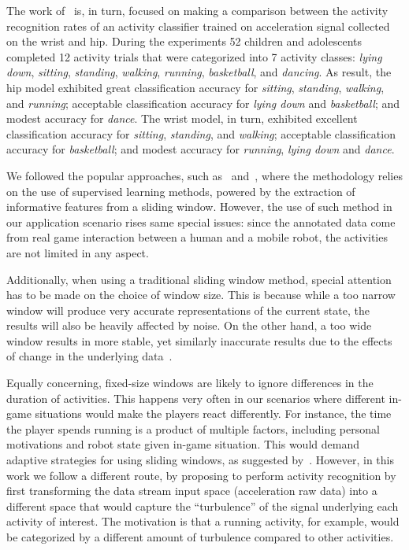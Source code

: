 The work of~\cite{trost_machine_2014} is, in turn, focused on making a comparison between the activity recognition rates of an activity classifier trained on acceleration signal collected on the wrist and hip. During the experiments 52 children and adolescents completed 12 activity trials that were categorized into 7 activity classes: \textit{lying down}, \textit{sitting}, \textit{standing}, \textit{walking}, \textit{running}, \textit{basketball}, and \textit{dancing}. As result, the hip model exhibited great classification accuracy for \textit{sitting}, \textit{standing}, \textit{walking}, and \textit{running}; acceptable classification accuracy for \textit{lying down} and \textit{basketball}; and modest accuracy for \textit{dance}. The wrist model, in turn, exhibited excellent classification accuracy for \textit{sitting}, \textit{standing}, and \textit{walking}; acceptable classification accuracy for \textit{basketball}; and modest accuracy for \textit{running}, \textit{lying down} and \textit{dance}.

We followed the popular approaches, such as~\cite{ravi_activity_2005} and~\cite{bao_activity_2004}, where the methodology relies on the use of supervised learning methods, powered by the extraction of informative features from a sliding window. However, the use of such method in our application scenario rises same special issues: since the annotated data come from real game interaction between a human and a mobile robot, the activities are not limited in any aspect.

Additionally, when using a traditional sliding window method, special attention has to be made on the choice of window size. This is because while a too narrow window will produce very accurate representations of the current state, the results will also be heavily affected by noise. On the other hand, a too wide window results in more stable, yet similarly inaccurate results due to the effects of change in the underlying data~\citep{bifet_learning_2007}. 

Equally concerning, fixed-size windows are likely to ignore differences in the duration of activities. This happens very often in our scenarios where different in-game situations would make the players react differently. For instance, the time the player spends running is a product of multiple factors, including personal motivations and robot state given in-game situation. This would demand adaptive strategies for using sliding windows, as suggested by~\cite{noor_adaptive_2016}. However, in this work we follow a different route, by proposing to perform activity recognition by first transforming the data stream input space (acceleration raw data) into a different space that would capture the ``turbulence'' of the signal underlying each activity of interest. The motivation is that a running activity, for example, would be categorized by a different amount of turbulence compared to other activities.

